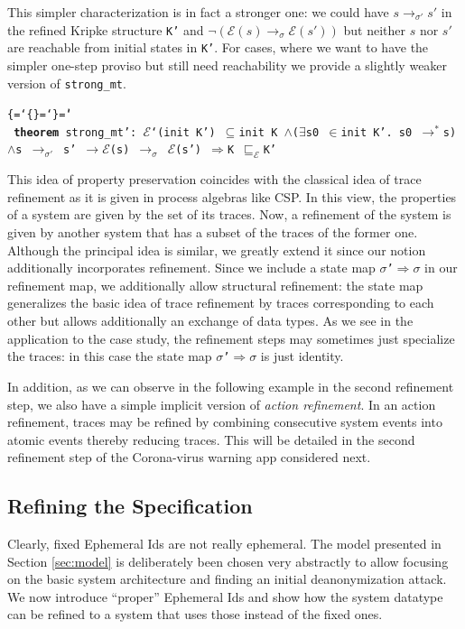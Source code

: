 \documentclass{llncs}
\newenvironment{ttbox}{\begin{alltt}\ttbraces\small\tt}%
                      {\end{alltt}}
\def\ttbraces{\let\.=\nobreak\chardef\{=`\{\chardef\}=`\}\chardef\|=`\\}
\newcommand\ttand{\mbox{{$\land$}}}
\newcommand\ttfun{\mbox{{$\Rightarrow$}}}
\newcommand\ttimp{\mbox{{$\longrightarrow$}}}
\newcommand\ttexists{\mbox{{$\exists$}}}
\newcommand\ttin{\mbox{{$\in$}}}
\newcommand\ttImp{\mbox{{$\Longrightarrow$}}}
\newcommand\ttrelIstar{\mbox{{$\to^*$}}}
\newcommand\ttrel[1]{\mbox{{$\to_{#1}$}}}
\newcommand\ttsubseteq{\mbox{{$\subseteq$}}}
\newcommand\ttsigma{\mbox{{$\sigma$}}}
\newcommand\ttmref[1]{\mbox{{$\sqsubseteq_{#1}$}}}
\newcommand\ttmeref{\ttmref{\mathcal{E}}}
\newcommand\ttecal{\mbox{$\mathcal{E}$}}
\newcommand\ttimg{\mbox{\texttt{`}}}
\begin{document}
This simpler characterization is in fact a stronger one: we could have $s \ttrel{\sigma'} s'$ 
in the refined Kripke structure \texttt{K'} and $\neg(\ttecal(s) \ttrel{\sigma} \ttecal(s'))$
but neither $s$ nor $s'$ are reachable from initial states in \texttt{K'}.
For cases, where we want to have the simpler one-step proviso but still need 
reachability we provide a slightly weaker version of \texttt{strong\_mt}.
\begin{ttbox}
{\bf{theorem}} strong_mt':  
\ttecal\ttimg(init K') \ttsubseteq init K \ttand (\ttexists s0 \ttin init K'. s0  \ttrelIstar s)
 \ttand s \ttrel{\sigma'} s' \ttimp \ttecal(s) \ttrel{\sigma} \ttecal(s') \ttImp K \ttmeref K'
\end{ttbox}

This idea of property preservation coincides with the classical idea of
trace refinement as it is given in process algebras like CSP. In this view,
the properties of a system are given by the set of its traces. Now, a refinement
of the system is given by another system that has a subset of the traces of the 
former one.
Although the principal idea is similar, we greatly extend it since our notion
additionally incorporates refinement. Since we include a state map 
\texttt{\ttsigma'\ttfun \ttsigma} in our refinement map, we additionally
allow structural refinement: the state map generalizes the basic idea of
trace refinement by traces corresponding to each other but allows additionally
an exchange of data types. 
As we see in the application to the case study, the refinement steps may
sometimes just specialize the traces: in this case the state map 
\texttt{\ttsigma'\ttfun \ttsigma} is just identity. 

In addition, as we can observe in the following example in the second refinement
step, we also have a simple implicit version of {\it action refinement}. In an
action refinement, traces may be refined by combining consecutive system events
into atomic events thereby reducing traces. This will be detailed in the second refinement step
of the Corona-virus warning app considered next.

\subsection{Refining the Specification}
\label{sec:corref}
Clearly, fixed Ephemeral Ids are not really ephemeral. The model presented
in Section \ref{sec:model} is deliberately been chosen very abstractly to allow focusing on
the basic system architecture and finding an initial deanonymization attack.
We now introduce ``proper'' Ephemeral Ids and show how the system datatype can be refined to a system
that uses those instead of the fixed ones.
\end{document}
